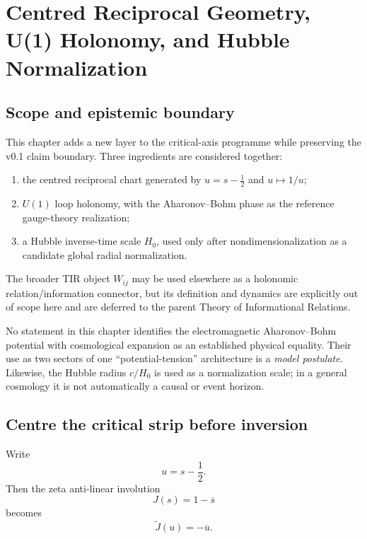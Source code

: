 \chapter{Centred Reciprocal Geometry, U(1) Holonomy, and Hubble Normalization}
\label{ch:inverse-holonomy}

\section{Scope and epistemic boundary}
This chapter adds a new layer to the critical-axis programme while preserving the v0.1 claim boundary.  Three ingredients are considered together:
\begin{enumerate}
\item the centred reciprocal chart generated by $u=s-\tfrac12$ and $u\mapsto1/u$;
\item $U(1)$ loop holonomy, with the Aharonov--Bohm phase as the reference gauge-theory realization;
\item a Hubble inverse-time scale $H_0$, used only after nondimensionalization as a candidate global radial normalization.
\end{enumerate}
The broader TIR object $W_{ij}$ may be used elsewhere as a holonomic relation/information connector, but its definition and dynamics are explicitly out of scope here and are deferred to the parent Theory of Informational Relations.

No statement in this chapter identifies the electromagnetic Aharonov--Bohm potential with cosmological expansion as an established physical equality.  Their use as two sectors of one ``potential-tension'' architecture is a \emph{model postulate}.  Likewise, the Hubble radius $c/H_0$ is used as a normalization scale; in a general cosmology it is not automatically a causal or event horizon.

\section{Centre the critical strip before inversion}
Write
\begin{equation}
u=s-\frac12.
\label{eq:centered-u}
\end{equation}
Then the zeta anti-linear involution
\begin{equation}
J(s)=1-\overline{s}
\end{equation}
becomes
\begin{equation}
\widetilde J(u)=-\overline u.
\label{eq:centered-J}
\end{equation}

